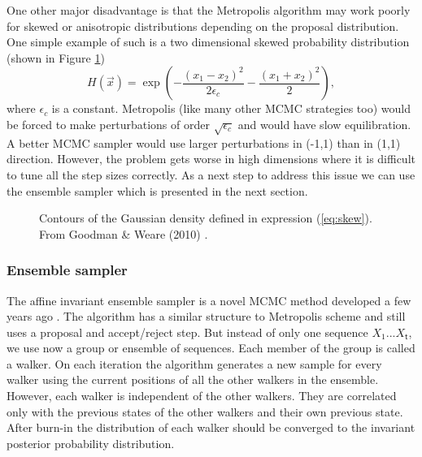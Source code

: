 \documentclass{wihuri}
\def\be{\begin{equation}}
\def\ee{\end{equation}}
\def\tstep{\mathsf{t}}
\begin{document}
One other major disadvantage is that the Metropolis algorithm may work poorly for skewed or anisotropic distributions depending on the proposal distribution. One simple example of such is a two dimensional skewed probability distribution (shown in Figure \ref{fig:skewed})
\be \label{eq:skew} 
H(\vec{x}) = \exp \left(-\frac{(x_{1}-x_{2})^{2}}{2\epsilon_{c}}-\frac{(x_{1}+x_{2})^{2}}{2} \right),
\ee
where $\epsilon_{c}$  is a constant. Metropolis (like many other MCMC strategies too) would be forced to make perturbations of order $\sqrt{\epsilon_{c}}$ and would have slow equilibration. A better MCMC sampler would use larger perturbations in (-1,1) than in (1,1) direction. However, the problem gets worse in high dimensions where it is difficult to tune all the step sizes correctly. As a next step to address this issue we can use the ensemble sampler which is presented in the next section. 


\begin{figure}
\centerline{}
\caption{Contours of the Gaussian density defined in expression (\ref{eq:skew}). From Goodman \& Weare (2010) \cite{ensemble1}.
\label{fig:skewed}}
\end{figure}


\subsubsection{Ensemble sampler}

The affine invariant ensemble sampler is a novel MCMC method developed a few years ago \cite{ensemble1}. %
The algorithm has a similar structure to Metropolis scheme and still uses a proposal and accept/reject step. But instead of only one sequence $X_{1}...X_{\tstep}$, we use now a group or ensemble of sequences. Each member of the group is called a walker. On each iteration the algorithm generates a new sample for every walker using the  current positions of all the other walkers in
the ensemble. However, each walker is independent of the other walkers. They are correlated only with the previous states of the other walkers and their own previous state. After burn-in the distribution of each walker should be converged to the invariant posterior probability distribution.

\end{document}
